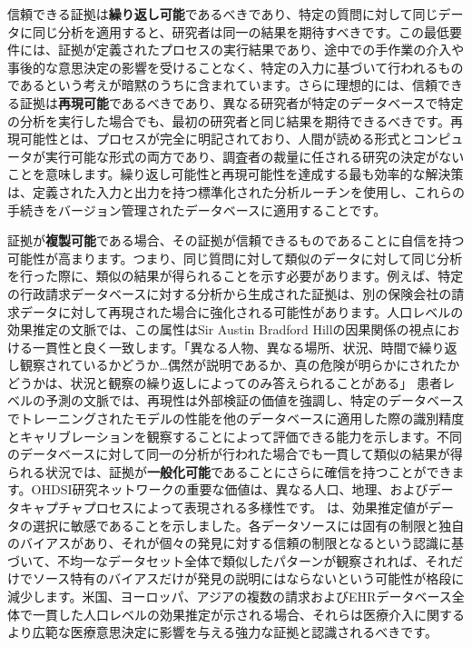 \documentclass[
  11pt]{book}
\theoremstyle{definition}
\theoremstyle{definition}
\theoremstyle{definition}
\theoremstyle{definition}
\theoremstyle{remark}
\begin{document}
信頼できる証拠は\textbf{繰り返し可能}であるべきであり、特定の質問に対して同じデータに同じ分析を適用すると、研究者は同一の結果を期待すべきです。この最低要件には、証拠が定義されたプロセスの実行結果であり、途中での手作業の介入や事後的な意思決定の影響を受けることなく、特定の入力に基づいて行われるものであるという考えが暗黙のうちに含まれています。さらに理想的には、信頼できる証拠は\textbf{再現可能}であるべきであり、異なる研究者が特定のデータベースで特定の分析を実行した場合でも、最初の研究者と同じ結果を期待できるべきです。再現可能性とは、プロセスが完全に明記されており、人間が読める形式とコンピュータが実行可能な形式の両方であり、調査者の裁量に任される研究の決定がないことを意味します。繰り返し可能性と再現可能性を達成する最も効率的な解決策は、定義された入力と出力を持つ標準化された分析ルーチンを使用し、これらの手続きをバージョン管理されたデータベースに適用することです。

証拠が\textbf{複製可能}である場合、その証拠が信頼できるものであることに自信を持つ可能性が高まります。つまり、同じ質問に対して類似のデータに対して同じ分析を行った際に、類似の結果が得られることを示す必要があります。例えば、特定の行政請求データベースに対する分析から生成された証拠は、別の保険会社の請求データに対して再現された場合に強化される可能性があります。人口レベルの効果推定の文脈では、この属性はSir Austin Bradford Hillの因果関係の視点における一貫性と良く一致します。「異なる人物、異なる場所、状況、時間で繰り返し観察されているかどうか\ldots 偶然が説明であるか、真の危険が明らかにされたかどうかは、状況と観察の繰り返しによってのみ答えられることがある」\citep{hill_1965} 患者レベルの予測の文脈では、再現性は外部検証の価値を強調し、特定のデータベースでトレーニングされたモデルの性能を他のデータベースに適用した際の識別精度とキャリブレーションを観察することによって評価できる能力を示します。不同のデータベースに対して同一の分析が行われた場合でも一貫して類似の結果が得られる状況では、証拠が\textbf{一般化可能}であることにさらに確信を持つことができます。OHDSI研究ネットワークの重要な価値は、異なる人口、地理、およびデータキャプチャプロセスによって表現される多様性です。\citet{madigan_2013} は、効果推定値がデータの選択に敏感であることを示しました。各データソースには固有の制限と独自のバイアスがあり、それが個々の発見に対する信頼の制限となるという認識に基づいて、不均一なデータセット全体で類似したパターンが観察されれば、それだけでソース特有のバイアスだけが発見の説明にはならないという可能性が格段に減少します。米国、ヨーロッパ、アジアの複数の請求およびEHRデータベース全体で一貫した人口レベルの効果推定が示される場合、それらは医療介入に関するより広範な医療意思決定に影響を与える強力な証拠と認識されるべきです。
\end{document}
